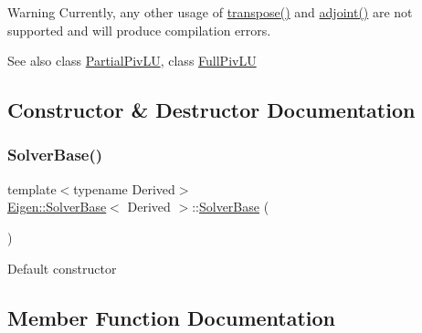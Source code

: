 \begin{DoxyCode}{0}
\end{DoxyCode}


\begin{DoxyWarning}{Warning}
Currently, any other usage of \mbox{\hyperlink{class_eigen_1_1_solver_base_a732e75b5132bb4db3775916927b0e86c}{transpose()}} and \mbox{\hyperlink{class_eigen_1_1_solver_base_a05a3686a89888681c8e0c2bcab6d1ce5}{adjoint()}} are not supported and will produce compilation errors.
\end{DoxyWarning}
\begin{DoxySeeAlso}{See also}
class \mbox{\hyperlink{class_eigen_1_1_partial_piv_l_u}{Partial\+Piv\+LU}}, class \mbox{\hyperlink{class_eigen_1_1_full_piv_l_u}{Full\+Piv\+LU}} 
\end{DoxySeeAlso}


\subsection{Constructor \& Destructor Documentation}
\mbox{\label{class_eigen_1_1_solver_base_a4d5e5baddfba3790ab1a5f247dcc4dc1}} 
\subsubsection{\texorpdfstring{SolverBase()}{SolverBase()}}
{\footnotesize\ttfamily template$<$typename Derived$>$ \\
\mbox{\hyperlink{class_eigen_1_1_solver_base}{Eigen\+::\+Solver\+Base}}$<$ Derived $>$\+::\mbox{\hyperlink{class_eigen_1_1_solver_base}{Solver\+Base}} (\begin{DoxyParamCaption}{ }\end{DoxyParamCaption})\hspace{0.3cm}{\ttfamily [inline]}}

Default constructor 

\subsection{Member Function Documentation}
\mbox{\label{class_eigen_1_1_solver_base_a05a3686a89888681c8e0c2bcab6d1ce5}} 
